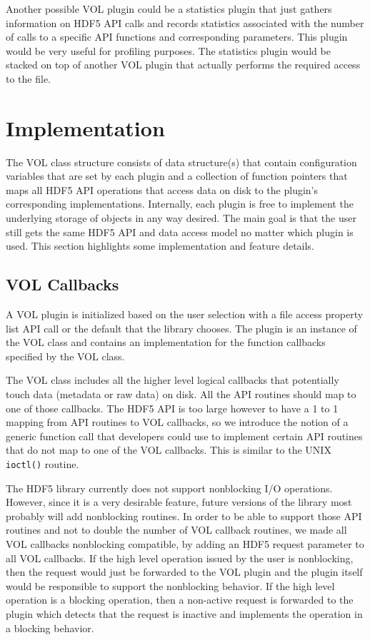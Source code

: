 \documentclass[letterpaper,hyper]{THG_RFC}
\begin{document}
Another possible VOL plugin could be a statistics plugin that just gathers information on HDF5 API calls and records statistics associated with the number of calls to a specific API functions and corresponding parameters. This plugin would be very useful for profiling purposes. The statistics plugin would be stacked on top of another VOL plugin that actually performs the required access to the file.
\clearpage
\section{Implementation}
The VOL class structure consists of data structure(s) that contain configuration variables that are set by each plugin and a collection of function pointers that maps all HDF5 API operations that access data on disk to the plugin's corresponding implementations. Internally, each plugin is free to implement the underlying storage of objects in any way desired. The main goal is that the user still gets the same HDF5 API and data access model no matter which plugin is used. This section highlights some implementation and feature details.  

\subsection{VOL Callbacks}
A VOL plugin is initialized based on the user selection with a file access property list API call or the default that the library chooses. The plugin is an instance of the VOL class and contains an implementation for the function callbacks specified by the VOL class. 

The VOL class includes all the higher level logical callbacks that potentially touch data (metadata or raw data) on disk. All the API routines should map to one of those callbacks. The HDF5 API is too large however to have a 1 to 1 mapping from API routines to VOL callbacks, so we introduce the notion of a generic function call that developers could use to implement certain API routines that do not map to one of the VOL callbacks. This is similar to the UNIX {\tt ioctl()} routine.

The HDF5 library currently does not support nonblocking I/O operations. However, since it is a very desirable feature, future versions of the library most probably will add nonblocking routines. In order to be able to support those API routines and not to double the number of VOL callback routines, we made all VOL callbacks nonblocking compatible, by adding an HDF5 request parameter to all VOL callbacks. If the high level operation issued by the user is nonblocking, then the request would just be forwarded to the VOL plugin and the plugin itself would be responsible to support the nonblocking behavior. If the high level operation is a blocking operation, then a non-active request is forwarded to the plugin which detects that the request is inactive and implements the operation in a blocking behavior. 
\end{document}
